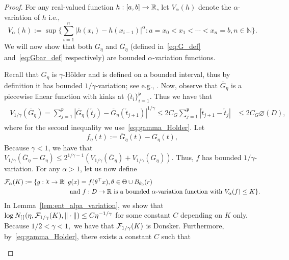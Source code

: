 {\begin{lemma}
\end{lemma}
\begin{proof}
 For any real-valued function $h: [a, b] \to \mathbb{R}$, let $V_\alpha(h)$ denote the $\alpha$-variation of $h$ i.e., 
\[ V_\alpha(h) := \sup\{ \sum_{i=1}^n |h(x_i)- h(x_{i-1})|^\alpha : a= x_0 < x_1<\cdots<x_n= b, n\in \mathbb{N}\}.\]
 We will now show that both $G_\eta$ and $\overline{G}_{\eta}$ (defined in~\eqref{eq:G_def} and~\eqref{eq:Gbar_def} respectively) are bounded $\alpha$-variation functions.

Recall that $G_\eta$ is $\gamma$-H\"{o}lder and is defined on a bounded interval, thus by definition it has bounded $1/\gamma$-variation; see e.g., \citet[Page 220-221]{Gine16}.  Now, observe that $\overline{G}_{\eta}$ is a piecewise linear function with kinks at $\{\check{t}_{i}\}_{i=1}^\mathfrak{p}.$ Thus we have that 
\begin{align}
\begin{split}
V_{1/\gamma}({\overline{G}_\eta}) = \sum_{j = 1}^\mathfrak{p} |\overline{G}_\eta(\check{t}_j)- \overline{G}_\eta(\check{t}_{j+1})|^{1/\gamma}\le 2C_G\sum_{j = 1}^\mathfrak{p} |\check{t}_{j+1} - \check{t}_j| &\le 2C_G \diameter(D),
\end{split}
\end{align}
where for the second inequality we use~\eqref{eq:gamma_Holder}. 
Let
\begin{equation}\label{eq:f_def}
f_\eta(t):= \overline{G}_{\eta}(t) - G_{\eta}(t),
\end{equation}
Because $ \gamma <1$, we have that $V_{1/\gamma}({\overline{G}_\eta} -{G}_\eta ) \le 2^{1/\gamma-1} (V_{1/\gamma}({\overline{G}_\eta}) + V_{1/\gamma}({{G}_\eta}))$. Thus, $f$ has bounded $1/\gamma$-variation. For any $\alpha>1$, let us now define
\begin{align}\label{eq:F_gamma_def}
\mathcal{F}_{\alpha}(K):= \{g: \rchi\to \R|\; &g(x)= f(\theta^\top x), \theta \in \Theta \cup B_{\theta_0}(r)\\ 
& \text{ and } f: D\to \R \text{ is a bounded $\alpha$-variation function with } V_\alpha(f) \le K\}.
\end{align}
 In Lemma~\ref{lem:ent_alpa_variation}, we show that 
$\log N_{[\,]}(\eta, \mathcal{F}_{1/\gamma}(K), \|\cdot\|) \le C \eta^{-1/\gamma}$ for some constant $C$ depending on $K$ only. Because $1/2 <\gamma<1,$ we have that $\mathcal{F}_{1/\gamma}(K)$ is Donsker.  Furthermore,  by~\eqref{eq:gamma_Holder}, there exists a constant $C$ such that 
\begin{align}
\begin{split}

\end{split}
\end{align}
\end{proof}}
